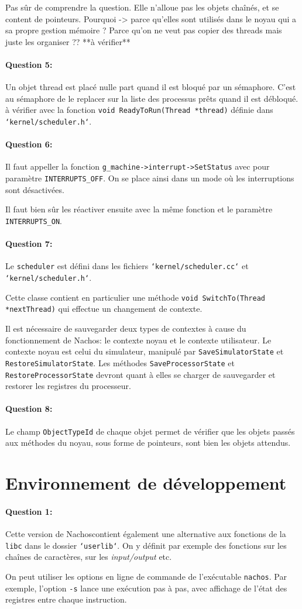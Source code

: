 \documentclass[11pt]{article}
\def\question#1{\paragraph{Question #1:}}
\def\pathfile#1{\texttt{`#1`}}
\def\var#1{\texttt{#1}}
\def\func#1{\texttt{#1}}
\def\obj#1{\texttt{#1}}
\def\comment#1{\color{red}#1\color{black}}
\def\nachos{Nachos}
\begin{document}
\comment{Pas sûr de comprendre la question. Elle n'alloue pas les objets chaînés, et se content de pointeurs. Pourquoi -> parce qu'elles sont utilisés dans le noyau qui a sa propre gestion mémoire ? Parce qu'on ne veut pas copier des threads mais juste les organiser ?? **à vérifier**  }

\question{5} Un objet thread est placé \comment{nulle part} quand il est bloqué par un sémaphore. C'est au sémaphore de le replacer sur la liste des processus prêts quand il est débloqué. \comment{à vérifier} avec la fonction \func{void ReadyToRun(Thread *thread)} définie dans \pathfile{kernel/scheduler.h}.

\question{6} Il faut appeller la fonction \func{g\_machine->interrupt->SetStatus} avec pour paramètre \var{INTERRUPTS\_OFF}. On se place ainsi dans un mode où les interruptions sont désactivées.  

Il faut bien sûr les réactiver ensuite avec la même fonction et le paramètre \var{INTERRUPTS\_ON}.

\question{7}  Le \obj{scheduler} est défini dans les fichiers \pathfile{kernel/scheduler.cc} et \pathfile{kernel/scheduler.h}.

Cette classe contient en particulier une méthode \func{void SwitchTo(Thread *nextThread)} qui effectue un changement de contexte.  

Il est nécessaire de sauvegarder deux types de contextes à cause du fonctionnement de \nachos: le contexte noyau et le contexte utilisateur.  
Le contexte noyau est celui du simulateur, manipulé par \func{SaveSimulatorState} et \func{RestoreSimulatorState}.  
Les méthodes \func{SaveProcessorState} et \func{RestoreProcessorState} devront quant à elles se charger de sauvegarder et restorer les registres du processeur.

\question{8}  Le champ \var{ObjectTypeId} de chaque objet permet de vérifier que les objets passés aux méthodes du noyau, sous forme de pointeurs, sont bien les objets attendus.

\section*{Environnement de développement}
\question{1} 
Cette version de \nachos contient également une alternative aux fonctions de la \texttt{libc} dans le dossier \pathfile{userlib}. On y définit par exemple des fonctions sur les chaînes de caractères, sur les \textit{input/output} etc.

On peut utiliser les options en ligne de commande de l'exécutable \texttt{nachos}. Par exemple, l'option \texttt{-s} lance une exécution pas à pas, avec affichage de l'état des registres entre chaque instruction.
\end{document}
